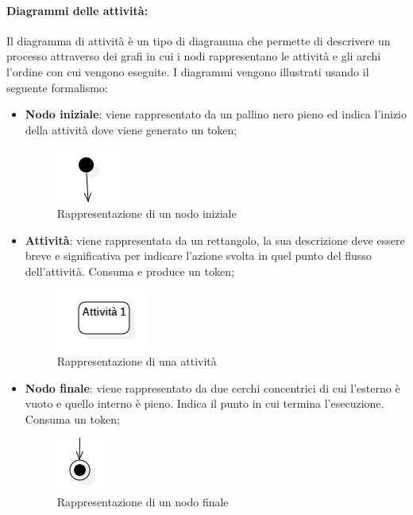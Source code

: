 \paragraph{Diagrammi delle attività:}\label{ProcessiPrimariProgettazioneUMLDiagrammiDellAttività} 
Il diagramma di attività è un tipo di diagramma che permette di descrivere un processo attraverso dei grafi in cui i nodi rappresentano le attività e gli archi l'ordine con cui vengono eseguite. I diagrammi vengono illustrati usando il seguente formalismo:
\begin{itemize}
	\item \textbf{Nodo iniziale}: viene rappresentato da un pallino nero pieno ed indica l'inizio della attività dove viene generato un token;
	\begin{figure}[H]
		\centering\includegraphics{../immagini/normeUML/nodoIni.png}
		\caption{Rappresentazione di un nodo iniziale}
	\end{figure}
	\item \textbf{Attività}: viene rappresentata da un rettangolo, la sua descrizione deve essere breve e significativa per indicare l'azione svolta in quel punto del flusso dell'attività. Consuma e produce un token;
	\begin{figure}[H]
		\centering\includegraphics{../immagini/normeUML/attivita.png}
		\caption{Rappresentazione di una attività}
	\end{figure}
	\item \textbf{Nodo finale}: viene rappresentato da due cerchi concentrici di cui l'esterno è vuoto e quello interno è pieno. Indica il punto in cui termina l'esecuzione. Consuma un token;
	\begin{figure}[H]
		\centering\includegraphics{../immagini/normeUML/nodoFine.png}
		\caption{Rappresentazione di un nodo finale}
	\end{figure}

\end{itemize}
